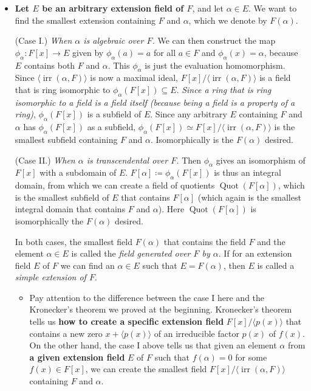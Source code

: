 \documentclass[11pt]{article}
\newcommand{\df}[1]{\textit{\textsf{#1}}}
\newcommand{\la}{\langle}
\newcommand{\ra}{\rangle}
\newcommand{\gen}[1]{\langle #1 \rangle}
\newcommand{\Quot}{\operatorname{Quot}} %
\newcommand{\irr}{\operatorname{irr}}
\begin{document}
\begin{itemize}
    \item \textbf{Let $E$ be an arbitrary extension field of $F$}, and let $\alpha \in E$. We want to find the smallest extension containing $F$ and $\alpha$, which we denote by $F(\alpha)$.
    
    (Case I.) \emph{When $\alpha$ is algebraic over $F$.} We can then construct the map $\phi_\alpha: F[x] \to E$ given by $\phi_\alpha(a) = a$ for all $a \in F$ and $\phi_\alpha(x) = \alpha$, because $E$ contains both $F$ and $\alpha$. This $\phi_\alpha$ is just the evaluation homomorphism. Since $\gen{\irr(\alpha,F)}$ is now a maximal ideal, $F[x]/\gen{\irr(\alpha,F)}$ is a field that is ring isomorphic to $\phi_\alpha(F[x]) \subseteq E$. \emph{Since a ring that is ring isomorphic to a field is a field itself (because being a field is a \emph{property} of a ring)}, $\phi_\alpha(F[x])$ is a subfield of $E$. Since any arbitrary $E$ containing $F$ and $\alpha$ has $\phi_\alpha(F[x])$ as a subfield, $\phi_\alpha(F[x]) \simeq F[x]/\la \irr(\alpha,F) \ra$ is the smallest subfield containing $F$ and $\alpha$. Isomorphically is the $F(\alpha)$ desired.
    
    (Case II.) \emph{When $\alpha$ is transcendental over $F$.} Then $\phi_\alpha$ gives an isomorphism of $F[x]$ with a subdomain of $E$. $F[\alpha] \coloneqq \phi_\alpha(F[x])$ is thus an integral domain, from which we can create a field of quotients $\Quot(F[\alpha])$, which is the smallest subfield of $E$ that contains $F[\alpha]$ (which again is the smallest integral domain that contains $F$ and $\alpha$). Here $\Quot(F[\alpha])$ is isomorphically the $F(\alpha)$ desired.
    
    In both cases, the smallest field $F(\alpha)$ that contains the field $F$ and the element $\alpha \in E$ is called the \df{field generated over $F$ by $\alpha$}. If for an extension field $E$ of $F$ we can find an $\alpha \in E$ such that $E = F(\alpha)$, then $E$ is called a \df{simple extension of $F$}.
    \begin{itemize}
        \item Pay attention to the difference between the case I here and the Kronecker's theorem we proved at the beginning. Kronecker's theorem tells us \textbf{how to create a specific extension field} $F[x]/\la p(x) \ra$ that contains a new zero $x + \la p(x) \ra$ of an irreducible factor $p(x)$ of $f(x)$. On the other hand, the case I above tells us that given an element $\alpha$ from \textbf{a given extension field} $E$ of $F$ such that $f(\alpha) = 0$ for some $f(x) \in F[x]$, we can create the smallest field $F[x]/\la \irr(\alpha,F) \ra$ containing $F$ and $\alpha$.
        

\end{itemize}
\end{itemize}
\end{document}

